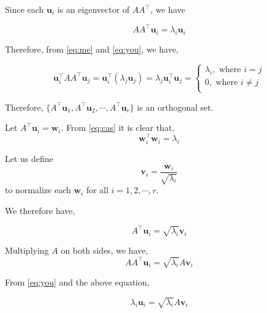 \documentclass[a4paper]{article}
\begin{document}
Since each $\boldsymbol{u}_i$ is an eigenvector of $AA^{\top}$, we have

\begin{equation}
AA^{\top}\boldsymbol{u}_i = \lambda_i \boldsymbol{u}_i 
\label{eq:you}
\end{equation}

Therefore, from \ref{eq:me} and \ref{eq:you}, we have,

\begin{equation}
\boldsymbol{u}_i^{\top}AA^{\top}\boldsymbol{u}_j  = \boldsymbol{u}_i^{\top} \left( \lambda_j \boldsymbol{u}_j \right) = \lambda_j \boldsymbol{u}_i^{\top} \boldsymbol{u}_j = \begin{cases}
\lambda_i, \text{ where } i = j \\
0, \text{ where } i \neq j\\
\end{cases}
\label{eq:cas}
\end{equation}

Therefore, $\{ A^{\top}\boldsymbol{u}_1, A^{\top}\boldsymbol{u}_2, \cdots, A^{\top}\boldsymbol{u}_r \}$ is an orthogonal set.

Let $A^{\top}\boldsymbol{u}_i = \boldsymbol{w}_i$. From \ref{eq:cas} it is clear that, 
\begin{equation}
\boldsymbol{w}_i^{\top} \boldsymbol{w}_i = \lambda_i
\end{equation}

Let us define \begin{equation}
\boldsymbol{v}_i = \frac{\boldsymbol{w}_i}{\sqrt{\lambda_{i}} }
\end{equation} to normalize each $\boldsymbol{w}_i$ for all $i=1,2,\cdots,r$.

We therefore have,

\begin{equation}
A^{\top} \boldsymbol{u}_i = \sqrt{\lambda_{i}} \boldsymbol{v}_i
\end{equation}

Multiplying $A$ on both sides, we have,
\begin{equation}
AA^{\top} \boldsymbol{u}_i = \sqrt{\lambda_{i}} A\boldsymbol{v}_i
\end{equation}

From \ref{eq:you} and the above equation,

\begin{equation}
\lambda_i \boldsymbol{u}_i = \sqrt{\lambda_{i}} A\boldsymbol{v}_i
\end{equation}
\end{document}
